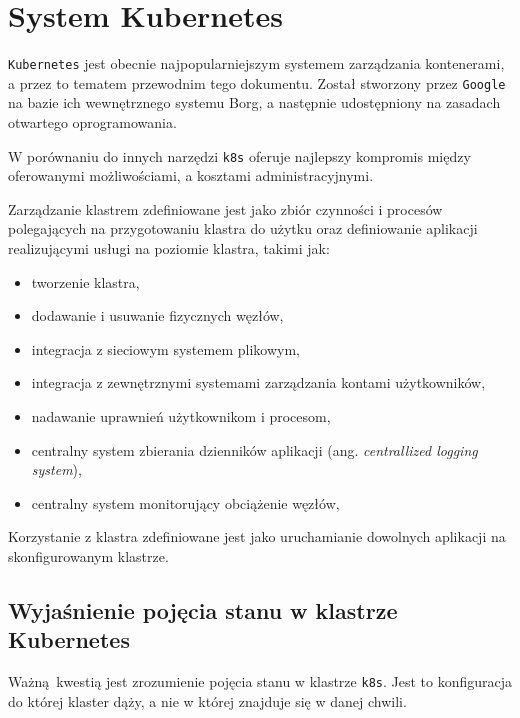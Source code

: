 \documentclass[a4paper,12pt,twoside,openany]{report}
\providecommand{\tightlist}{%
  \setlength{\itemsep}{0pt}\setlength{\parskip}{0pt}}
\newcommand{\passthrough}[1]{#1}
\renewcommand{\href}[2]{#2\footnote{\url{#1}}}
\let\footnote=\endnote
\begin{document}
\hypertarget{system-kubernetes}{%
\chapter{System Kubernetes}\label{system-kubernetes}}

\href{https://kubernetes.io/}{\passthrough{\lstinline!Kubernetes!}} jest
obecnie najpopularniejszym systemem zarządzania kontenerami, a przez to
tematem przewodnim tego dokumentu. Został stworzony przez
\passthrough{\lstinline!Google!} na bazie ich wewnętrznego systemu Borg,
a następnie udostępniony na zasadach otwartego oprogramowania.

W porównaniu do innych narzędzi \passthrough{\lstinline!k8s!} oferuje
najlepszy kompromis między oferowanymi możliwościami, a kosztami
administracyjnymi.

Zarządzanie klastrem zdefiniowane jest jako zbiór czynności i procesów
polegających na przygotowaniu klastra do użytku oraz definiowanie
aplikacji realizującymi usługi na poziomie klastra, takimi jak:

\begin{itemize}
\tightlist
\item
  tworzenie klastra,
\item
  dodawanie i usuwanie fizycznych węzłów,
\item
  integracja z sieciowym systemem plikowym,
\item
  integracja z zewnętrznymi systemami zarządzania kontami użytkowników,
\item
  nadawanie uprawnień użytkownikom i procesom,
\item
  centralny system zbierania dzienników aplikacji (ang.
  \emph{centrallized logging system}),
\item
  centralny system monitorujący obciążenie węzłów,
\end{itemize}

Korzystanie z klastra zdefiniowane jest jako uruchamianie dowolnych
aplikacji na skonfigurowanym klastrze.

\hypertarget{wyjaux15bnienie-pojux119cia-stanu-w-klastrze-kubernetes}{%
\section{Wyjaśnienie pojęcia stanu w klastrze
Kubernetes}\label{wyjaux15bnienie-pojux119cia-stanu-w-klastrze-kubernetes}}

Ważną~kwestią jest zrozumienie pojęcia stanu w klastrze
\passthrough{\lstinline!k8s!}. Jest to konfiguracja do której klaster
dąży, a nie w której znajduje się w danej chwili.
\end{document}
